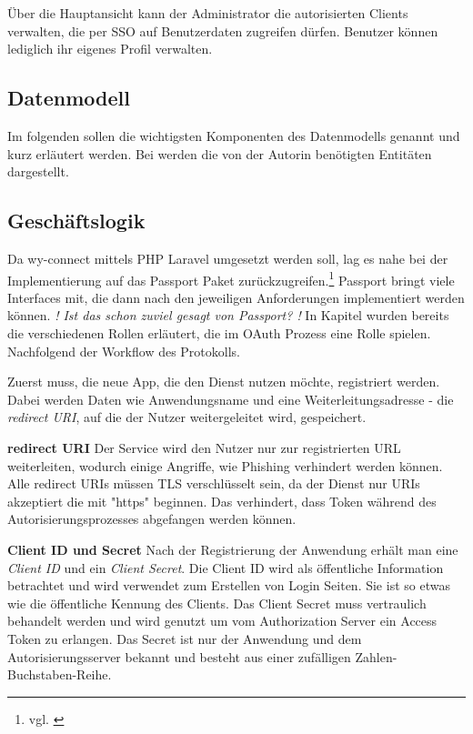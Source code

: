Über die Hauptansicht kann der Administrator die autorisierten Clients verwalten, die per \ac{SSO} auf  Benutzerdaten zugreifen dürfen. Benutzer können lediglich ihr eigenes Profil verwalten.

\subsection{Datenmodell}
\label{sec:Datenmodell}

Im folgenden sollen die wichtigsten Komponenten des Datenmodells genannt und kurz erläutert werden. Bei werden die von der Autorin benötigten Entitäten dargestellt. 


\subsection{Geschäftslogik}
\label{sec:Geschaeftslogik}

Da wy-connect mittels \ac{PHP} Laravel umgesetzt werden soll, lag es nahe bei der Implementierung auf das Passport Paket zurückzugreifen.\footnote{vgl. \cite{Passport}}
Passport bringt viele Interfaces mit, die dann nach den jeweiligen Anforderungen implementiert werden können. 
\textit{! Ist das schon zuviel gesagt von Passport? !}
In Kapitel  wurden bereits die verschiedenen Rollen erläutert, die im OAuth Prozess eine Rolle spielen. Nachfolgend der Workflow des Protokolls.

Zuerst muss, die neue App, die den Dienst nutzen möchte, registriert werden. Dabei werden Daten wie Anwendungsname und eine Weiterleitungsadresse - die \textit{redirect URI}, auf die der Nutzer weitergeleitet wird, gespeichert.

\textbf{redirect URI}
Der Service wird den Nutzer nur zur registrierten URL weiterleiten, wodurch einige Angriffe, wie \zB Phishing verhindert werden können. Alle redirect URIs müssen TLS verschlüsselt sein, da der Dienst nur URIs akzeptiert die mit "https" beginnen. Das verhindert, dass Token während des Autorisierungsprozesses abgefangen werden können. 

\textbf{Client ID und Secret}
Nach der Registrierung der Anwendung erhält man eine \textit{Client ID} und ein \textit{Client Secret}. Die Client ID wird als öffentliche Information betrachtet und wird verwendet zum Erstellen von Login Seiten. Sie ist so etwas wie die öffentliche Kennung des Clients. 
Das Client Secret muss vertraulich behandelt werden und wird genutzt um vom Authorization Server ein Access Token zu erlangen. Das Secret ist nur der Anwendung und dem Autorisierungsserver bekannt und besteht aus einer zufälligen Zahlen-Buchstaben-Reihe. 


